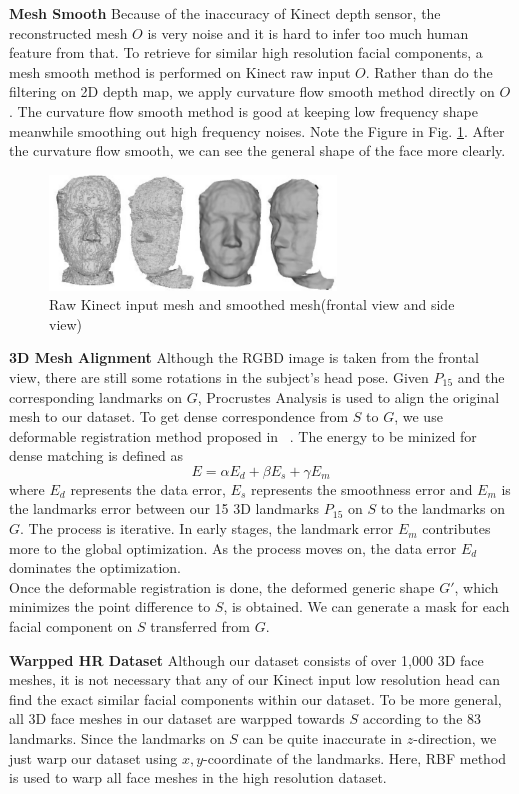 \documentclass[annual]{acmsiggraph}
\begin{document}
\textbf{Mesh Smooth} Because of the inaccuracy of Kinect depth sensor, the reconstructed mesh $O$ is very noise and it is hard to infer too much human feature from that. To retrieve for similar high resolution facial components, a mesh smooth method is performed on Kinect raw input $O$. Rather than do the filtering on 2D depth map, we apply curvature flow smooth method directly on $O$. The curvature flow smooth method is good at keeping low frequency shape meanwhile smoothing out high frequency noises. Note the Figure in Fig. \ref{smoothed}. After the curvature flow smooth, we can see the general shape of the face more clearly.

\begin{figure}[ht]
\centering
\includegraphics[width=3in]{images/smoothed}
\caption{Raw Kinect input mesh and smoothed mesh(frontal view and side view)}\label{smoothed}
\end{figure}

\textbf{3D Mesh Alignment} Although the RGBD image is taken from the frontal view, there are still some rotations in the subject's head pose. Given $P_{15}$ and the corresponding landmarks on $G$, Procrustes Analysis is used to align the original mesh to our dataset. 
To get dense correspondence from $S$ to $G$, we use deformable registration method proposed in ~\cite{allen}. The energy to be minized for dense matching is defined as
\begin{equation}
E={\alpha}E_d+{\beta}E_s+{\gamma}E_m
\end{equation}
where $E_d$ represents the data error, $E_s$ represents the smoothness error and $E_m$ is the landmarks error between our 15 3D landmarks $P_{15}$ on $S$ to the landmarks on $G$. The process is iterative. In early stages, the landmark error $E_m$ contributes more to the global optimization. As the process moves on, the data error $E_d$ dominates the optimization.\\
Once the deformable registration is done, the deformed generic shape $G'$, which minimizes the point difference to $S$, is obtained. We can generate a mask for each facial component on $S$ transferred from $G$.

\textbf{Warpped HR Dataset} Although our dataset consists of over 1,000 3D face meshes, it is not necessary that any of our Kinect input low resolution head can find the exact similar facial components within our dataset. To be more general, all 3D face meshes in our dataset are warpped towards $S$ according to the 83 landmarks. Since the landmarks on $S$ can be quite inaccurate in $z$-direction, we just warp our dataset using $x,y$-coordinate of the landmarks. Here, RBF method is used to warp all face meshes in the high resolution dataset.
\end{document}
